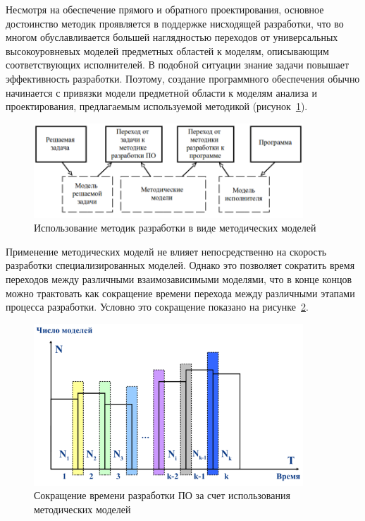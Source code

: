 Несмотря на обеспечение прямого и обратного проектирования, основное достоинство методик проявляется в поддержке нисходящей разработки, что во многом обуславливается большей наглядностью переходов от универсальных высокоуровневых моделей предметных областей к моделям, описывающим соответствующих исполнителей. В подобной ситуации знание задачи повышает эффективность разработки. Поэтому, создание программного обеспечения обычно начинается с привязки модели предметной области к моделям анализа и проектирования, предлагаемым используемой методикой (рисунок~\ref{fig01-05}).

\begin{figure}[htbp]
    \centering
    \includegraphics[width=0.9\textwidth]{img/fig01-05.png}
    \caption{Использование методик разработки в виде методических моделей}
    \label{fig01-05}
\end{figure}

Применение методических моделй не влияет непосредственно на скорость разработки специализированных моделей. Однако это позволяет сократить время переходов между различными взаимозависимыми моделями, что в конце концов можно трактовать как сокращение времени перехода между различными этапами процесса разработки. Условно это сокращение показано на рисунке~\ref{fdiag04}.

\begin{figure}[htbp]
    \centering
    \includegraphics[width=0.9\textwidth]{img/fdiag04.png}
    \caption{Сокращение времени разработки ПО за счет использования методических моделей}
    \label{fdiag04}
\end{figure}

